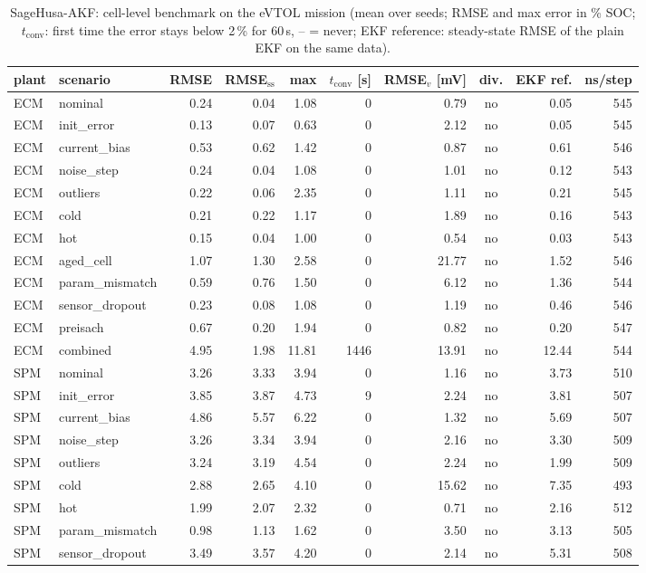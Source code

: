 \begin{table}[H]\centering\footnotesize\setlength{\tabcolsep}{4pt}
\caption{SageHusa-AKF: cell-level benchmark on the eVTOL mission (mean over seeds; RMSE and max error in \% SOC; $t_\mathrm{conv}$: first time the error stays below 2\,\% for 60\,s, -- = never; EKF reference: steady-state RMSE of the plain EKF on the same data).}\label{tab:cell_SageHusaAKF}
\begin{tabular}{llrrrrrcrr}\toprule
plant & scenario & RMSE & RMSE$_\mathrm{ss}$ & max & $t_\mathrm{conv}$ [s] & RMSE$_v$ [mV] & div. & EKF ref. & ns/step \\ \midrule
ECM & nominal & 0.24 & 0.04 & 1.08 & 0 & 0.79 & no & 0.05 & 545 \\
ECM & init\_error & 0.13 & 0.07 & 0.63 & 0 & 2.12 & no & 0.05 & 545 \\
ECM & current\_bias & 0.53 & 0.62 & 1.42 & 0 & 0.87 & no & 0.61 & 546 \\
ECM & noise\_step & 0.24 & 0.04 & 1.08 & 0 & 1.01 & no & 0.12 & 543 \\
ECM & outliers & 0.22 & 0.06 & 2.35 & 0 & 1.11 & no & 0.21 & 545 \\
ECM & cold & 0.21 & 0.22 & 1.17 & 0 & 1.89 & no & 0.16 & 543 \\
ECM & hot & 0.15 & 0.04 & 1.00 & 0 & 0.54 & no & 0.03 & 543 \\
ECM & aged\_cell & 1.07 & 1.30 & 2.58 & 0 & 21.77 & no & 1.52 & 546 \\
ECM & param\_mismatch & 0.59 & 0.76 & 1.50 & 0 & 6.12 & no & 1.36 & 544 \\
ECM & sensor\_dropout & 0.23 & 0.08 & 1.08 & 0 & 1.19 & no & 0.46 & 546 \\
ECM & preisach & 0.67 & 0.20 & 1.94 & 0 & 0.82 & no & 0.20 & 547 \\
ECM & combined & 4.95 & 1.98 & 11.81 & 1446 & 13.91 & no & 12.44 & 544 \\
\midrule
SPM & nominal & 3.26 & 3.33 & 3.94 & 0 & 1.16 & no & 3.73 & 510 \\
SPM & init\_error & 3.85 & 3.87 & 4.73 & 9 & 2.24 & no & 3.81 & 507 \\
SPM & current\_bias & 4.86 & 5.57 & 6.22 & 0 & 1.32 & no & 5.69 & 507 \\
SPM & noise\_step & 3.26 & 3.34 & 3.94 & 0 & 2.16 & no & 3.30 & 509 \\
SPM & outliers & 3.24 & 3.19 & 4.54 & 0 & 2.24 & no & 1.99 & 509 \\
SPM & cold & 2.88 & 2.65 & 4.10 & 0 & 15.62 & no & 7.35 & 493 \\
SPM & hot & 1.99 & 2.07 & 2.32 & 0 & 0.71 & no & 2.16 & 512 \\
SPM & param\_mismatch & 0.98 & 1.13 & 1.62 & 0 & 3.50 & no & 3.13 & 505 \\
SPM & sensor\_dropout & 3.49 & 3.57 & 4.20 & 0 & 2.14 & no & 5.31 & 508 \\
\bottomrule\end{tabular}\end{table}
